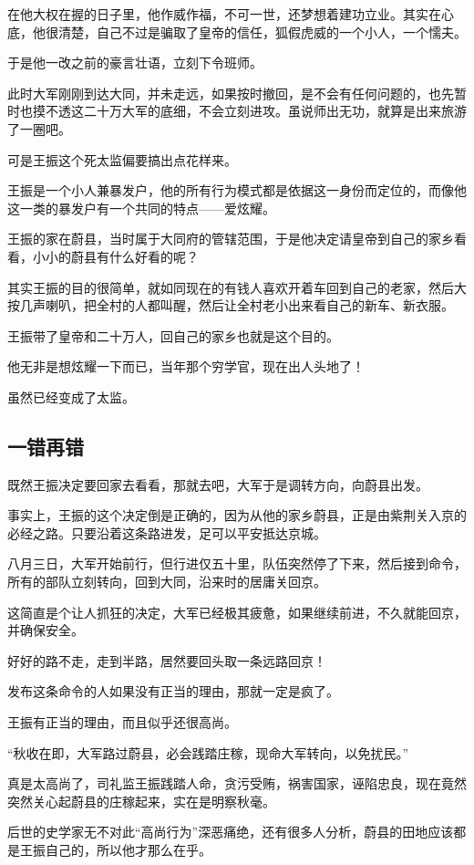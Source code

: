 \begin{multicols}{\theparacolNo}
在他大权在握的日子里，他作威作福，不可一世，还梦想着建功立业。其实在心底，他很清楚，自己不过是骗取了皇帝的信任，狐假虎威的一个小人，一个懦夫。

于是他一改之前的豪言壮语，立刻下令班师。

此时大军刚刚到达大同，并未走远，如果按时撤回，是不会有任何问题的，也先暂时也摸不透这二十万大军的底细，不会立刻进攻。虽说师出无功，就算是出来旅游了一圈吧。

可是王振这个死太监偏要搞出点花样来。

王振是一个小人兼暴发户，他的所有行为模式都是依据这一身份而定位的，而像他这一类的暴发户有一个共同的特点——爱炫耀。

王振的家在蔚县，当时属于大同府的管辖范围，于是他决定请皇帝到自己的家乡看看，小小的蔚县有什么好看的呢？

其实王振的目的很简单，就如同现在的有钱人喜欢开着车回到自己的老家，然后大按几声喇叭，把全村的人都叫醒，然后让全村老小出来看自己的新车、新衣服。

王振带了皇帝和二十万人，回自己的家乡也就是这个目的。

他无非是想炫耀一下而已，当年那个穷学官，现在出人头地了！

虽然已经变成了太监。

\subsection{一错再错}
既然王振决定要回家去看看，那就去吧，大军于是调转方向，向蔚县出发。

事实上，王振的这个决定倒是正确的，因为从他的家乡蔚县，正是由紫荆关入京的必经之路。只要沿着这条路进发，足可以平安抵达京城。

八月三日，大军开始前行，但行进仅五十里，队伍突然停了下来，然后接到命令，所有的部队立刻转向，回到大同，沿来时的居庸关回京。

这简直是个让人抓狂的决定，大军已经极其疲惫，如果继续前进，不久就能回京，并确保安全。

好好的路不走，走到半路，居然要回头取一条远路回京！

发布这条命令的人如果没有正当的理由，那就一定是疯了。

王振有正当的理由，而且似乎还很高尚。

“秋收在即，大军路过蔚县，必会践踏庄稼，现命大军转向，以免扰民。”

真是太高尚了，司礼监王振践踏人命，贪污受贿，祸害国家，诬陷忠良，现在竟然突然关心起蔚县的庄稼起来，实在是明察秋毫。

后世的史学家无不对此“高尚行为”深恶痛绝，还有很多人分析，蔚县的田地应该都是王振自己的，所以他才那么在乎。


\end{multicols}
